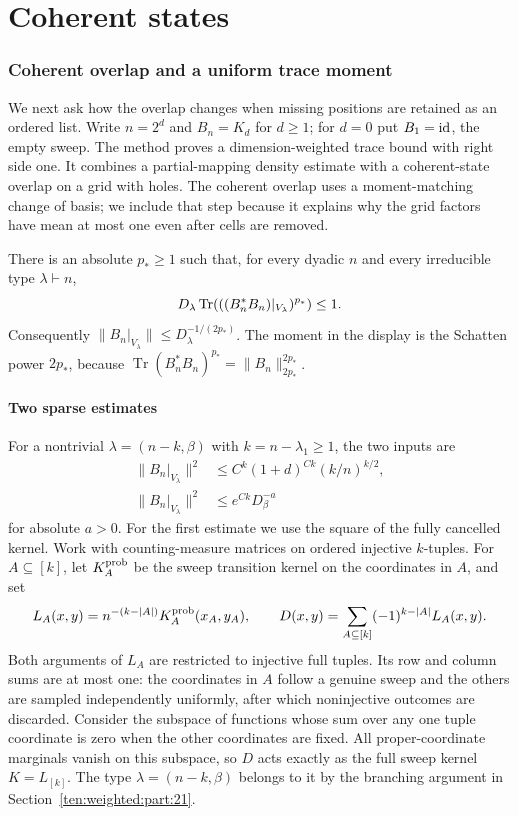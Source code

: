 \part{Coherent states}\label{part:coherent}
\section{Coherent overlap and a uniform trace moment}
\label{rec:sec-coherent}

We next ask how the overlap changes when missing positions are retained as an ordered list. Write $n=2^d$ and $B_n=K_d$ for $d\ge1$; for $d=0$
put $B_1=\mathrm{id}$, the empty sweep. The method proves a dimension-weighted trace bound with right side one.  It combines a partial-mapping density
estimate with a coherent-state overlap on a grid with holes.  The
coherent overlap uses a moment-matching change of basis; we include
that step because it explains why the grid factors have mean at most
one even after cells are removed.

\begin{theorem}\label{rec:coherent-main}
There is an absolute $p_*\ge1$ such that, for every dyadic $n$ and
every irreducible type $\lambda\vdash n$,
\begin{equation}\label{rec:coherent-unit-moment}
 D_\lambda\operatorname{Tr}\!\left(((B_n^*B_n)|_{V_\lambda})^{p_*}\right)\le1.
\end{equation}
Consequently $\|B_n|_{V_\lambda}\|\le D_\lambda^{-1/(2p_*)}$. The moment in the display is the Schatten power $2p_*$, because $\operatorname{Tr}(B_n^*B_n)^{p_*}=\|B_n\|_{2p_*}^{2p_*}$.
\end{theorem}

\subsection{Two sparse estimates}

For a nontrivial $\lambda=(n-k,\beta)$ with $k=n-\lambda_1\ge1$, the two inputs are
\begin{align}
 \|B_n|_{V_\lambda}\|^2
 &\le C^k(1+d)^{Ck}(k/n)^{k/2},
       \label{rec:coherent-contact-bound}\\
 \|B_n|_{V_\lambda}\|^2
 &\le e^{Ck}D_\beta^{-a}
       \label{rec:coherent-tail-bound}
\end{align}
for absolute $a>0$.
For the first estimate we use the square of the fully cancelled kernel. Work with counting-measure matrices on ordered injective $k$-tuples. For $A\subseteq[k]$, let $K_A^{\rm prob}$ be the sweep transition kernel on the coordinates in $A$, and set
\[
 L_A(x,y)=n^{-(k-|A|)}K_A^{\rm prob}(x_A,y_A),\qquad
 D(x,y)=\sum_{A\subseteq[k]}(-1)^{k-|A|}L_A(x,y).
\]
Both arguments of $L_A$ are restricted to injective full tuples. Its row and column sums are at most one: the coordinates in $A$ follow a genuine sweep and the others are sampled independently uniformly, after which noninjective outcomes are discarded. Consider the subspace of functions whose sum over any one tuple
coordinate is zero when the other coordinates are fixed.  All
proper-coordinate marginals vanish on this subspace, so $D$ acts
exactly as the full sweep kernel $K=L_{[k]}$.  The type
$\lambda=(n-k,\beta)$ belongs to it by the branching argument in
Section~\ref{ten:weighted:part:21}.

